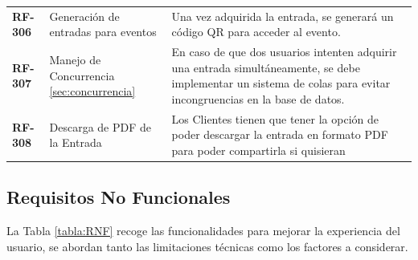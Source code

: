 \begin{longtable}{ p{2.5cm} p{4cm} p{9cm}  }
    \textbf{RF-306} & Generación de entradas para eventos & Una vez adquirida la entrada, se generará un código QR para acceder al evento.\\
    \textbf{RF-307} & Manejo de Concurrencia \ref{sec:concurrencia} & En caso de que dos usuarios intenten adquirir una entrada simultáneamente, se debe implementar 
    un sistema de colas para evitar incongruencias en la base de datos. \\
    \textbf{RF-308} & Descarga de PDF de la Entrada & Los Clientes tienen que tener la opción de poder descargar la entrada en formato PDF para poder
    compartirla si quisieran\\
    \end{longtable}
    \newpage
    \subsection{Requisitos No Funcionales}
    La Tabla \ref{tabla:RNF} recoge las funcionalidades para mejorar la experiencia del usuario, se abordan tanto las limitaciones 
    técnicas como los factores a considerar.

